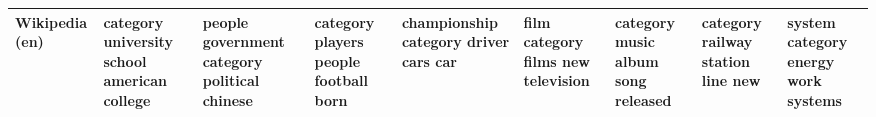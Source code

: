 \documentclass[11pt,a4paper]{article}
\begin{document}
\begin{appendices}
\begin{table*}[htp]
\begin{tiny}
\begin{tabular}{|p{}|p{}|p{}|p{}|p{}|p{}|p{}|p{}|p{}|}
Wikipedia (en) & category \newline university \newline school \newline american \newline college & people \newline government \newline category \newline political \newline chinese & category \newline players \newline people \newline football \newline born & championship \newline category \newline driver \newline cars \newline car & film \newline category \newline films \newline new \newline television & category \newline music \newline album \newline song \newline released & category \newline railway \newline station \newline line \newline new & system \newline category \newline energy \newline work \newline systems\\\hline

\end{tabular}
\end{tiny}
\end{table*}
\end{appendices}
\end{document}
